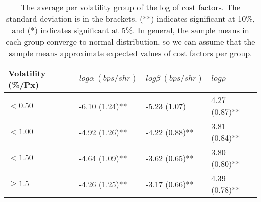 \begin{table}
\centering
\caption{The average per volatility group of the log of cost factors. The standard deviation is in the brackets. (**) indicates significant at 10\%, and (*) indicates significant at 5\%. In general, the sample means in each group converge to normal distribution, so we can assume that the sample means approximate expected values of cost factors per group.
}
\label{tbl:param_estimates}
\begin{tabular}{llll}
\toprule
Volatility (\%/Px) & $log \alpha\ (bps/shr)$ & $log \beta\ (bps/shr)$ &    $log \rho$  \\
\midrule
           $<0.50$ &          -6.10 (1.24)** &           -5.23 (1.07) &  4.27 (0.87)** \\
           $<1.00$ &          -4.92 (1.26)** &         -4.22 (0.88)** &  3.81 (0.84)** \\
           $<1.50$ &          -4.64 (1.09)** &         -3.62 (0.65)** &  3.80 (0.80)** \\
        $\geq 1.5$ &          -4.26 (1.25)** &         -3.17 (0.66)** &  4.39 (0.78)** \\
\bottomrule
\end{tabular}
\end{table}

